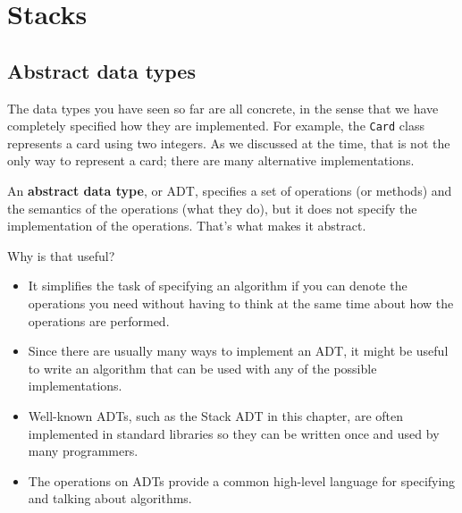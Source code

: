 

%

\chapter{Stacks}

\section{Abstract data types}

The data types you have seen so far are all concrete, in the
sense that we have completely specified how they are implemented.
For example, the {\tt Card} class represents a card using two
integers.  As we discussed at the time, that is not the only way
to represent a card; there are many alternative implementations.

An {\bf abstract data type}, or ADT, specifies a set of operations (or
methods) and the semantics of the operations (what they do), but it
does not specify the implementation of the operations.  That's
what makes it abstract.

Why is that useful?

\begin{itemize}

\item It simplifies the task of specifying an algorithm if you
can denote the operations you need without having to think at the
same time about how the operations are performed.

\item Since there are usually many ways to implement an ADT,
it might be useful to write an algorithm that can be used with
any of the possible implementations.

\item Well-known ADTs, such as the Stack ADT in this chapter,
are often implemented in standard libraries so they can be written
once and used by many programmers.

\item The operations on ADTs provide a common high-level language
for specifying and talking about algorithms.

\end{itemize}

